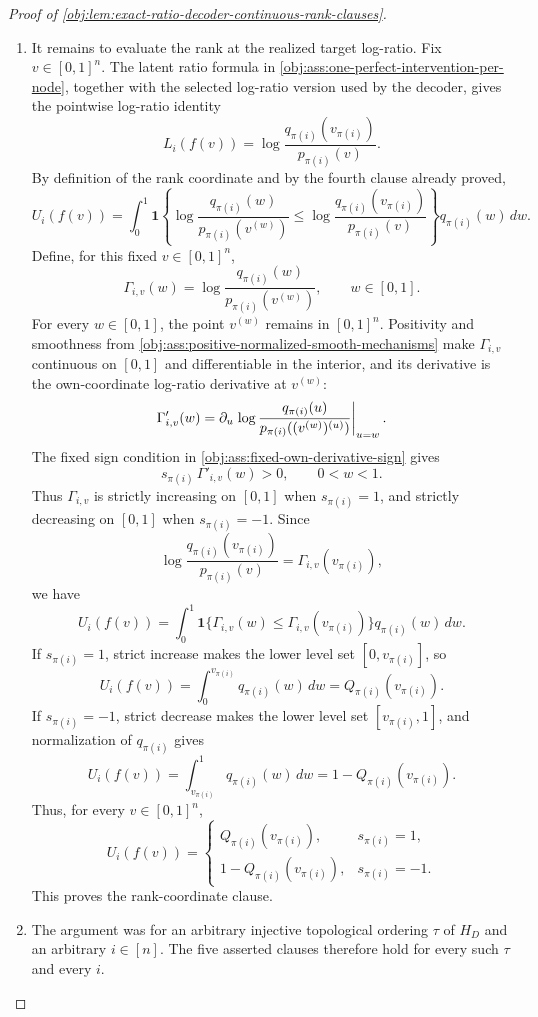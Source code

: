 \documentclass[11pt]{article}
\begin{document}
\begin{proof}[Proof of \cref{obj:lem:exact-ratio-decoder-continuous-rank-clauses}]
\begin{enumerate}
\item It remains to evaluate the rank at the realized target log-ratio.  Fix \(v\in[0,1]^n\).  The latent ratio formula in \cref{obj:ass:one-perfect-intervention-per-node}, together with the selected log-ratio version used by the decoder, gives the pointwise log-ratio identity
\[
L_i(f(v))
=
\log\frac{q_{\pi(i)}(v_{\pi(i)})}{p_{\pi(i)}(v)} .
\]
By definition of the rank coordinate and by the fourth clause already proved,
\[
U_i(f(v))
=
\int_0^1
\mathbf 1\!\left\{
\log\frac{q_{\pi(i)}(w)}{p_{\pi(i)}(v^{(w)})}
\le
\log\frac{q_{\pi(i)}(v_{\pi(i)})}{p_{\pi(i)}(v)}
\right\}
q_{\pi(i)}(w)\,dw .
\]
Define, for this fixed \(v\in[0,1]^n\),
\[
\Gamma_{i,v}(w)
=
\log\frac{q_{\pi(i)}(w)}{p_{\pi(i)}(v^{(w)})},
\qquad
w\in[0,1].
\]
For every \(w\in[0,1]\), the point \(v^{(w)}\) remains in \([0,1]^n\).  Positivity and smoothness from \cref{obj:ass:positive-normalized-smooth-mechanisms} make \(\Gamma_{i,v}\) continuous on \([0,1]\) and differentiable in the interior, and its derivative is the own-coordinate log-ratio derivative at \(v^{(w)}\):
\[
\Gamma'_{i,v}(w)
=
\partial_{u}\nobreak\left.
\log\frac{q_{\pi(i)}(u)}{p_{\pi(i)}((v^{(w)})^{(u)})}
\right|_{u=w}.
\]
The fixed sign condition in \cref{obj:ass:fixed-own-derivative-sign} gives
\[
s_{\pi(i)}\,\Gamma'_{i,v}(w)>0,
\qquad 0<w<1.
\]
Thus \(\Gamma_{i,v}\) is strictly increasing on \([0,1]\) when \(s_{\pi(i)}=1\), and strictly decreasing on \([0,1]\) when \(s_{\pi(i)}=-1\).  Since
\[
\log\frac{q_{\pi(i)}(v_{\pi(i)})}{p_{\pi(i)}(v)}
=
\Gamma_{i,v}(v_{\pi(i)}),
\]
we have
\[
U_i(f(v))
=
\int_0^1
\mathbf 1\{\Gamma_{i,v}(w)\le \Gamma_{i,v}(v_{\pi(i)})\}
q_{\pi(i)}(w)\,dw .
\]
If \(s_{\pi(i)}=1\), strict increase makes the lower level set \([0,v_{\pi(i)}]\), so
\[
U_i(f(v))
=
\int_0^{v_{\pi(i)}}q_{\pi(i)}(w)\,dw
=
Q_{\pi(i)}(v_{\pi(i)}).
\]
If \(s_{\pi(i)}=-1\), strict decrease makes the lower level set \([v_{\pi(i)},1]\), and normalization of \(q_{\pi(i)}\) gives
\[
U_i(f(v))
=
\int_{v_{\pi(i)}}^1 q_{\pi(i)}(w)\,dw
=
1-Q_{\pi(i)}(v_{\pi(i)}).
\]
Thus, for every \(v\in[0,1]^n\),
\[
U_i(f(v))
=
\begin{cases}
Q_{\pi(i)}(v_{\pi(i)}), & s_{\pi(i)}=1,\\
1-Q_{\pi(i)}(v_{\pi(i)}), & s_{\pi(i)}=-1.
\end{cases}
\]
This proves the rank-coordinate clause. %

\item The argument was for an arbitrary injective topological ordering \(\tau\) of \(H_D\) and an arbitrary \(i\in[n]\).  The five asserted clauses therefore hold for every such \(\tau\) and every \(i\). %
\end{enumerate}
\end{proof}
\end{document}
